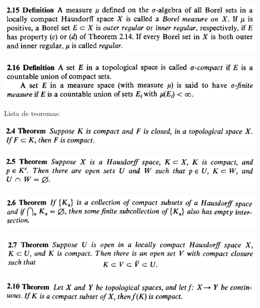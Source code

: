 \documentclass[12pt]{article}
\begin{document}
		\begin{center}
		\includegraphics{d2ponto15}
		\end{center}

		\begin{center}
		\includegraphics{d2ponto16}
		\end{center}

Lista de teoremas:

		\begin{center}
		\includegraphics{2ponto4}
		\end{center}

		\begin{center}
		\includegraphics{2ponto5}
		\end{center}

		\begin{center}
		\includegraphics{2ponto6}
		\end{center}

		\begin{center}
		\includegraphics{2ponto7}
		\end{center}

		\begin{center}
		\includegraphics{2ponto10}
		\end{center}
\end{document}
